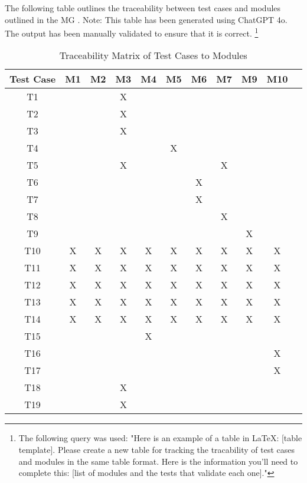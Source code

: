 \documentclass[12pt, titlepage]{article}
\begin{document}
The following table outlines the traceability between test cases and modules
outlined in the MG \citep{MG}. Note: This table has been generated using ChatGPT
4o. The output has been manually validated to ensure that it is correct.
\footnote{The following query was used: "Here is an example of a table in LaTeX:
[table template]. Please create a new table for tracking the tracability of test cases and modules in the same table format. Here is the information you'll need to complete this: [list of modules and the tests that validate each one]."}


\begin{table}[h]
\centering
\begin{tabular}{|c|c|c|c|c|c|c|c|c|c|c|}
\hline
\textbf{Test Case} & \textbf{M1} & \textbf{M2} & \textbf{M3} & \textbf{M4} & \textbf{M5} & \textbf{M6} & \textbf{M7} & \textbf{M9} & \textbf{M10} \\ \hline
T1 &  &  & X &  &  &  &  &  &  \\ \hline
T2 &  &  & X &  &  &  &  &  &  \\ \hline
T3 &  &  & X &  &  &  &  &  &  \\ \hline
T4 &  &  &   &  & X &  &  &  &  \\ \hline
T5 &  &  & X &  &   &  & X &  &  \\ \hline
T6 &  &  &  &  &  & X &  &  &  \\ \hline
T7 &  &  &  &  &  & X &  &  &  \\ \hline
T8 &  &  &  &  &  &  & X &  &  \\ \hline
T9 &  &  &  &  &  &  &  & X &  \\ \hline
T10 & X & X & X & X & X & X & X & X & X \\ \hline
T11 & X & X & X & X & X & X & X & X & X \\ \hline
T12 & X & X & X & X & X & X & X & X & X \\ \hline
T13 & X & X & X & X & X & X & X & X & X \\ \hline
T14 & X & X & X & X & X & X & X & X & X \\ \hline
T15 &  &  &  & X &  &  &  &  &  \\ \hline
T16 &  &  &  &  &  &  &  &  & X \\ \hline
T17 &  &  &  &  &  &  &  &  & X \\ \hline
T18 &  &  & X &  &  &  &  &  &  \\ \hline
T19 &  &  & X &  &  &  &  &  &  \\ \hline
\end{tabular}
\caption{Traceability Matrix of Test Cases to Modules}
\label{tab:traceability-matrix}
\end{table}
\end{document}
